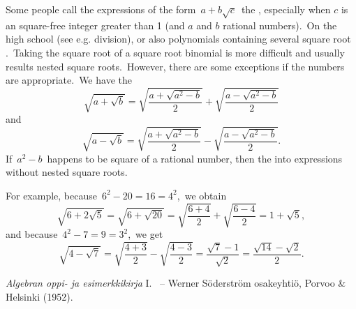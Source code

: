 \documentclass[12pt]{article}
\theoremstyle{definition}
\begin{document}
Some people call the expressions of the form\, $a\!+\!b\sqrt{c}$\, the , especially when $c$ is an square-free integer greater than 1 (and $a$ and $b$  rational numbers).\, On the high school  (see e.g. division), or also polynomials containing several square root .\, Taking the square root of a square root binomial is more difficult and usually results nested square roots.\, However, there are some exceptions if the numbers are appropriate.\, We have the 
$$\sqrt{a+\sqrt{b}} = \sqrt{\frac{a+\sqrt{a^2-b}}{2}}+\sqrt{\frac{a-\sqrt{a^2-b}}{2}}$$
and
$$\sqrt{a-\sqrt{b}} = \sqrt{\frac{a+\sqrt{a^2-b}}{2}}-\sqrt{\frac{a-\sqrt{a^2-b}}{2}}.$$
If\, $a^2\!-\!b$\, happens to be square of a rational number, then the  into expressions without nested square roots.

For example, because\, $6^2\!-\!20 = 16 = 4^2$,\, we obtain
$$\sqrt{6\!+\!2\sqrt{5}} = \sqrt{6\!+\!\sqrt{20}} = 
\sqrt{\frac{6\!+\!4}{2}}+\sqrt{\frac{6\!-\!4}{2}} = 1\!+\!\sqrt{5},$$
and because\, $4^2\!-\!7 = 9 = 3^2$,\, we get
$$\sqrt{4\!-\!\sqrt{7}} = \sqrt{\frac{4\!+\!3}{2}}-\sqrt{\frac{4\!-\!3}{2}}
= \frac{\sqrt{7}\!-\!1}{\sqrt{2}} = \frac{\sqrt{14}\!-\!\sqrt{2}}{2}.$$

\begin{thebibliography}{9}
 {\em Algebran oppi- ja esimerkkikirja} I.  \, -- Werner S\"oderstr\"om osakeyhti\"o, Porvoo \& Helsinki (1952).
\end{thebibliography}
\end{document}
